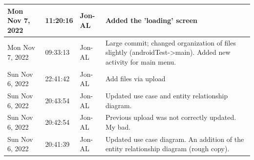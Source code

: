 \documentclass[11pt]{article}
\begin{document}
\begin{center}
\begin{longtable}{|p{2.7cm}|l|p{2cm}|p{8cm}|}
           \hline Mon Nov 7, 2022                            & 11:20:16                           & Jon-AL                                  & Added the 'loading' screen                                                                                                                                                                                                                                                                                 \\
           \hline Mon Nov 7, 2022                            & 09:33:13                           & Jon-AL                                  & Large commit; changed organization of files slightly (androidTest->main). Added new activity for main menu.                                                                                                                                                                                                \\
           \hline Sun Nov 6, 2022                            & 22:41:42                           & Jon-AL                                  & Add files via upload                                                                                                                                                                                                                                                                                       \\
           \hline Sun Nov 6, 2022                            & 20:43:54                           & Jon-AL                                  & Updated use case and entity relationship diagram.                                                                                                                                                                                                                                                          \\
           \hline Sun Nov 6, 2022                            & 20:42:54                           & Jon-AL                                  & Previous upload was not correctly updated. My bad.                                                                                                                                                                                                                                                         \\
           \hline Sun Nov 6, 2022                            & 20:41:39                           & Jon-AL                                  & Updated use case diagram. An addition of the entity relationship diagram (rough copy).                                                                                                                                                                                                                     \\

\end{longtable}
\end{center}
\end{document}
